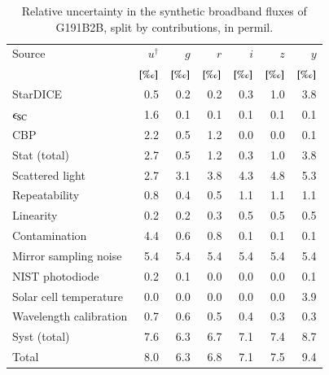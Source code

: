 \begin{table}
  \centering
  \caption{Relative uncertainty in the synthetic broadband fluxes of
    G191B2B, split by contributions, in permil.}
  \label{tab:budget}
  \begin{tabular}{@{}l@{}rrrrrr@{}}
    \toprule
    \toprule
    Source & $u^\dag$ & $g$ & $r$ & $i$ & $z$ & $y$ \\
    & $[\text{\textperthousand}]$ & $[\text{\textperthousand}]$ & $[\text{\textperthousand}]$ & $[\text{\textperthousand}]$ & $[\text{\textperthousand}]$ & $[\text{\textperthousand}]$\\
    \midrule
    StarDICE & 0.5 & 0.2 & 0.2 & 0.3 & 1.0 & 3.8 \\
    $\epsilon_{\mathrm{SC}}$ & 1.6 & 0.1 & 0.1 & 0.1 & 0.1 & 0.1 \\
    CBP & 2.2 & 0.5 & 1.2 & 0.0 & 0.0 & 0.1 \\
    \midrule
    Stat (total) & 2.7 & 0.5 & 1.2 & 0.3 & 1.0 & 3.8 \\
    \midrule
    Scattered light & 2.7 & 3.1 & 3.8 & 4.3 & 4.8 & 5.3 \\
    Repeatability & 0.8 & 0.4 & 0.5 & 1.1 & 1.1 & 1.1 \\
    Linearity & 0.2 & 0.2 & 0.3 & 0.5 & 0.5 & 0.5 \\
    Contamination & 4.4 & 0.6 & 0.8 & 0.1 & 0.1 & 0.1 \\
    Mirror sampling noise & 5.4 & 5.4 & 5.4 & 5.4 & 5.4 & 5.4 \\
    NIST photodiode & 0.2 & 0.1 & 0.0 & 0.0 & 0.0 & 0.1 \\
    Solar cell temperature & 0.0 & 0.0 & 0.0 & 0.0 & 0.0 & 3.9 \\
    Wavelength calibration & 0.7 & 0.6 & 0.5 & 0.4 & 0.3 & 0.3 \\
    \midrule
    Syst (total) & 7.6 & 6.3 & 6.7 & 7.1 & 7.4 & 8.7 \\
    \midrule
    Total & 8.0 & 6.3 & 6.8 & 7.1 & 7.5 & 9.4 \\
    \bottomrule
  \end{tabular}
\end{table}

